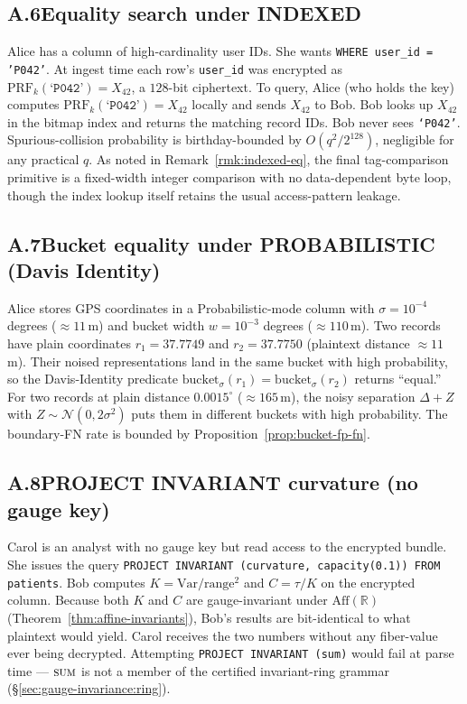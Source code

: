 \documentclass[11pt,letterpaper]{article}
\begin{document}
\subsection*{A.6\quad Equality search under INDEXED}
Alice has a column of high-cardinality user IDs. She wants
\texttt{WHERE user\_id = 'P042'}. At ingest time each row's
\texttt{user\_id} was encrypted as $\mathrm{PRF}_k(\texttt{`P042'})
= X_{42}$, a $128$-bit ciphertext. To query, Alice (who holds the
key) computes $\mathrm{PRF}_k(\texttt{`P042'}) = X_{42}$ locally
and sends $X_{42}$ to Bob. Bob looks up $X_{42}$ in the bitmap
index and returns the matching record IDs. Bob never sees
\texttt{`P042'}. Spurious-collision probability is birthday-bounded
by $O(q^2/2^{128})$, negligible for any practical $q$. As noted
in Remark~\ref{rmk:indexed-eq}, the final tag-comparison primitive
is a fixed-width integer comparison with no data-dependent byte
loop, though the index lookup itself retains the usual
access-pattern leakage.

\subsection*{A.7\quad Bucket equality under PROBABILISTIC (Davis Identity)}
Alice stores GPS coordinates in a Probabilistic-mode column with
$\sigma = 10^{-4}$ degrees ($\approx 11$\,m) and bucket width
$w = 10^{-3}$ degrees ($\approx 110$\,m). Two records have plain
coordinates $r_1 = 37.7749$ and $r_2 = 37.7750$ (plaintext
distance $\approx 11$\,m). Their noised representations land in
the same bucket with high probability, so the Davis-Identity
predicate $\mathrm{bucket}_\sigma(r_1) =
\mathrm{bucket}_\sigma(r_2)$ returns ``equal.'' For two records
at plain distance $0.0015^\circ$ ($\approx 165$\,m), the noisy
separation $\Delta + Z$ with $Z \sim \mathcal{N}(0, 2\sigma^2)$
puts them in different buckets with high probability. The
boundary-FN rate is bounded by Proposition~\ref{prop:bucket-fp-fn}.

\subsection*{A.8\quad PROJECT INVARIANT curvature (no gauge key)}
Carol is an analyst with no gauge key but read access to the
encrypted bundle. She issues the query
\verb|PROJECT INVARIANT (curvature, capacity(0.1)) FROM patients|.
Bob computes
$K = \mathrm{Var}/\mathrm{range}^2$ and $C = \tau / K$ on the
encrypted column. Because both $K$ and $C$ are gauge-invariant
under $\mathrm{Aff}(\mathbb{R})$
(Theorem~\ref{thm:affine-invariants}), Bob's results are
bit-identical to what plaintext would yield. Carol receives the
two numbers without any fiber-value ever being decrypted.
Attempting \verb|PROJECT INVARIANT (sum)| would fail at parse
time --- $\textsc{sum}$ is not a member of the certified
invariant-ring grammar (\S\ref{sec:gauge-invariance:ring}).
\end{document}
